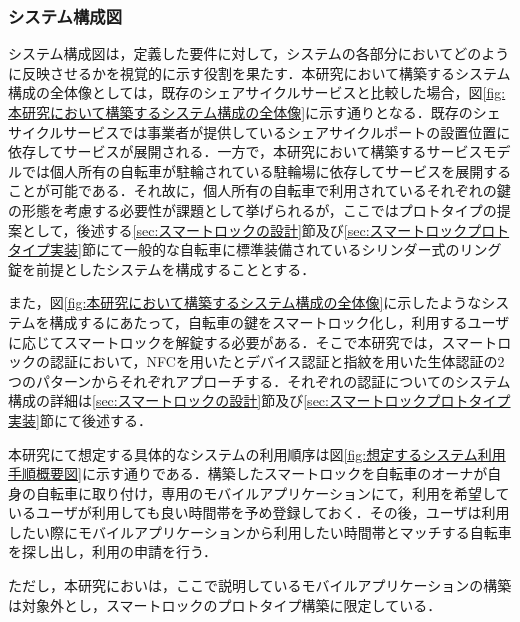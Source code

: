       \subsubsection{システム構成図}
        \label{sec:システム構成図}
          \par システム構成図は，定義した要件に対して，システムの各部分においてどのように反映させるかを視覚的に示す役割を果たす．本研究において構築するシステム構成の全体像としては，既存のシェアサイクルサービスと比較した場合，図\ref{fig:本研究において構築するシステム構成の全体像}に示す通りとなる．既存のシェサイクルサービスでは事業者が提供しているシェアサイクルポートの設置位置に依存してサービスが展開される．一方で，本研究において構築するサービスモデルでは個人所有の自転車が駐輪されている駐輪場に依存してサービスを展開することが可能である．それ故に，個人所有の自転車で利用されているそれぞれの鍵の形態を考慮する必要性が課題として挙げられるが，ここではプロトタイプの提案として，後述する\ref{sec:スマートロックの設計}節及び\ref{sec:スマートロックプロトタイプ実装}節にて一般的な自転車に標準装備されているシリンダー式のリング錠を前提としたシステムを構成することとする．
           \par また，図\ref{fig:本研究において構築するシステム構成の全体像}に示したようなシステムを構成するにあたって，自転車の鍵をスマートロック化し，利用するユーザに応じてスマートロックを解錠する必要がある．そこで本研究では，スマートロックの認証において，NFCを用いたとデバイス認証と指紋を用いた生体認証の2つのパターンからそれぞれアプローチする．それぞれの認証についてのシステム構成の詳細は\ref{sec:スマートロックの設計}節及び\ref{sec:スマートロックプロトタイプ実装}節にて後述する．
           \par 本研究にて想定する具体的なシステムの利用順序は図\ref{fig:想定するシステム利用手順概要図}に示す通りである．構築したスマートロックを自転車のオーナが自身の自転車に取り付け，専用のモバイルアプリケーションにて，利用を希望しているユーザが利用しても良い時間帯を予め登録しておく．その後，ユーザは利用したい際にモバイルアプリケーションから利用したい時間帯とマッチする自転車を探し出し，利用の申請を行う．
           \par ただし，本研究においは，ここで説明しているモバイルアプリケーションの構築は対象外とし，スマートロックのプロトタイプ構築に限定している．
          
